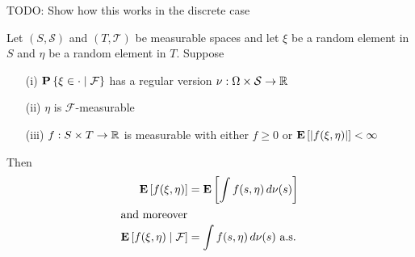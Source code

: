 TODO: Show how this works in the discrete case

\begin{thm}\label{Disintegration}Let $(S, \mathcal{S})$ and $(T, \mathcal{T})$ be measurable
  spaces and let $\xi$ be a random element in $S$ and $\eta$ be a
  random element in $T$.  Suppose 
\begin{itemize}
\item[(i)] $\cprobability{\mathcal{F}}{\xi \in
    \cdot}$ has a regular version $\nu : \Omega \times \mathcal{S} \to
  \reals$ 
\item[(ii)] $\eta$ is  $\mathcal{F}$-measurable 
\item[(iii)] $f : S \times T \to \reals$ is
  measurable with either $f \geq 0$ or $\expectation{\abs{f(\xi,
      \eta)}}< \infty$
\end{itemize}
Then 
\begin{align*}
\expectation{f(\xi, \eta)} &= \expectation{\int f(s, \eta) \, d\nu(s)}\\
\intertext{and moreover}
\cexpectationlong{\mathcal{F}}{f(\xi, \eta)} &= \int f(s, \eta) \, d\nu(s)
\text{ a.s.} \\
\end{align*}
\end{thm}
